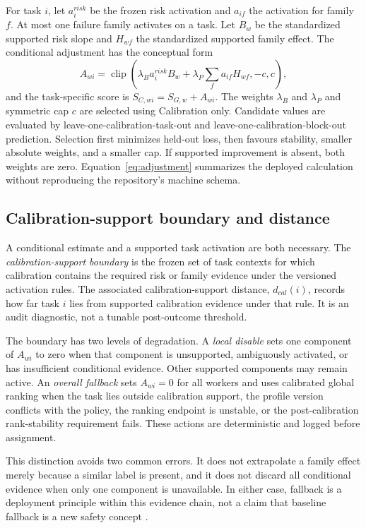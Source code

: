For task $i$, let $a_i^{risk}$ be the frozen risk activation and $a_{if}$ the activation for family $f$. At most one failure family activates on a task. Let $B_w$ be the standardized supported risk slope and $H_{wf}$ the standardized supported family effect. The conditional adjustment has the conceptual form
\begin{equation}
  A_{wi}=\operatorname{clip}\!\left(
     \lambda_B a_i^{risk}B_w+
     \lambda_P\sum_f a_{if}H_{wf},
     -c,c\right),
  \label{eq:adjustment}
\end{equation}
and the task-specific score is $S_{C,wi}=S_{G,w}+A_{wi}$. The weights $\lambda_B$ and $\lambda_P$ and symmetric cap $c$ are selected using Calibration only. Candidate values are evaluated by leave-one-calibration-task-out and leave-one-calibration-block-out prediction. Selection first minimizes held-out loss, then favours stability, smaller absolute weights, and a smaller cap. If supported improvement is absent, both weights are zero. Equation~\ref{eq:adjustment} summarizes the deployed calculation without reproducing the repository's machine schema.

\subsection{Calibration-support boundary and distance}

A conditional estimate and a supported task activation are both necessary. The \emph{calibration-support boundary} is the frozen set of task contexts for which calibration contains the required risk or family evidence under the versioned activation rules. The associated calibration-support distance, $d_{cal}(i)$, records how far task $i$ lies from supported calibration evidence under that rule. It is an audit diagnostic, not a tunable post-outcome threshold.

The boundary has two levels of degradation. A \emph{local disable} sets one component of $A_{wi}$ to zero when that component is unsupported, ambiguously activated, or has insufficient conditional evidence. Other supported components may remain active. An \emph{overall fallback} sets $A_{wi}=0$ for all workers and uses calibrated global ranking when the task lies outside calibration support, the profile version conflicts with the policy, the ranking endpoint is unstable, or the post-calibration rank-stability requirement fails. These actions are deterministic and logged before assignment.

This distinction avoids two common errors. It does not extrapolate a family effect merely because a similar label is present, and it does not discard all conditional evidence when only one component is unavailable. In either case, fallback is a deployment principle within this evidence chain, not a claim that baseline fallback is a new safety concept \cite{laroche2019spibb,sachdeva2020support}.


